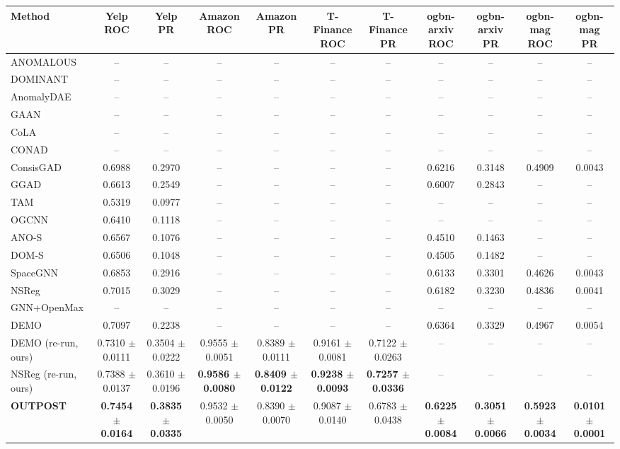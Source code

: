 \begin{table}[t]
\centering
\small
\begin{tabular}{lcccccccccc}
\toprule
Method & Yelp ROC & Yelp PR & Amazon ROC & Amazon PR & T-Finance ROC & T-Finance PR & ogbn-arxiv ROC & ogbn-arxiv PR & ogbn-mag ROC & ogbn-mag PR \\
\midrule
ANOMALOUS & -- & -- & -- & -- & -- & -- & -- & -- & -- & -- \\
DOMINANT & -- & -- & -- & -- & -- & -- & -- & -- & -- & -- \\
AnomalyDAE & -- & -- & -- & -- & -- & -- & -- & -- & -- & -- \\
GAAN & -- & -- & -- & -- & -- & -- & -- & -- & -- & -- \\
CoLA & -- & -- & -- & -- & -- & -- & -- & -- & -- & -- \\
CONAD & -- & -- & -- & -- & -- & -- & -- & -- & -- & -- \\
ConsisGAD & 0.6988 & 0.2970 & -- & -- & -- & -- & 0.6216 & 0.3148 & 0.4909 & 0.0043 \\
GGAD & 0.6613 & 0.2549 & -- & -- & -- & -- & 0.6007 & 0.2843 & -- & -- \\
TAM & 0.5319 & 0.0977 & -- & -- & -- & -- & -- & -- & -- & -- \\
OGCNN & 0.6410 & 0.1118 & -- & -- & -- & -- & -- & -- & -- & -- \\
ANO-S & 0.6567 & 0.1076 & -- & -- & -- & -- & 0.4510 & 0.1463 & -- & -- \\
DOM-S & 0.6506 & 0.1048 & -- & -- & -- & -- & 0.4505 & 0.1482 & -- & -- \\
SpaceGNN & 0.6853 & 0.2916 & -- & -- & -- & -- & 0.6133 & 0.3301 & 0.4626 & 0.0043 \\
NSReg & 0.7015 & 0.3029 & -- & -- & -- & -- & 0.6182 & 0.3230 & 0.4836 & 0.0041 \\
GNN+OpenMax & -- & -- & -- & -- & -- & -- & -- & -- & -- & -- \\
DEMO & 0.7097 & 0.2238 & -- & -- & -- & -- & 0.6364 & 0.3329 & 0.4967 & 0.0054 \\
DEMO (re-run, ours) & 0.7310 $\pm$ 0.0111 & 0.3504 $\pm$ 0.0222 & 0.9555 $\pm$ 0.0051 & 0.8389 $\pm$ 0.0111 & 0.9161 $\pm$ 0.0081 & 0.7122 $\pm$ 0.0263 & -- & -- & -- & -- \\
NSReg (re-run, ours) & 0.7388 $\pm$ 0.0137 & 0.3610 $\pm$ 0.0196 & \textbf{0.9586 $\pm$ 0.0080} & \textbf{0.8409 $\pm$ 0.0122} & \textbf{0.9238 $\pm$ 0.0093} & \textbf{0.7257 $\pm$ 0.0336} & -- & -- & -- & -- \\
\midrule
\textbf{OUTPOST} & \textbf{0.7454 $\pm$ 0.0164} & \textbf{0.3835 $\pm$ 0.0335} & 0.9532 $\pm$ 0.0050 & 0.8390 $\pm$ 0.0070 & 0.9087 $\pm$ 0.0140 & 0.6783 $\pm$ 0.0438 & \textbf{0.6225 $\pm$ 0.0084} & \textbf{0.3051 $\pm$ 0.0066} & \textbf{0.5923 $\pm$ 0.0034} & \textbf{0.0101 $\pm$ 0.0001} \\

\end{tabular}
\end{table}
